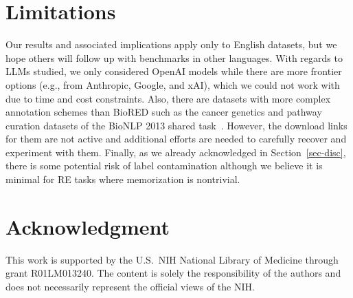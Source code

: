 \documentclass[11pt]{article}
\begin{document}
\section{Limitations}
Our results and associated implications apply only to English datasets, but we hope others will follow up with benchmarks in other languages. With regards to LLMs studied, we only considered OpenAI models while there are more frontier options (e.g., from Anthropic, Google, and xAI), which we could not work with due to time and cost constraints. Also, there are datasets with more complex annotation schemes than BioRED such as the cancer genetics and pathway curation datasets of the BioNLP 2013 shared task~\cite{nedellec2013overview}. However, the download links for them are not active and additional efforts are needed to carefully recover and experiment with them. Finally, as we  already acknowledged in Section~\ref{sec-disc}, there is some potential risk of label contamination although we believe it is minimal for RE tasks where memorization is nontrivial.  

\section*{Acknowledgment}
This work is supported by the U.S.~NIH National Library of Medicine through grant R01LM013240.  The content is solely the responsibility
of the authors and does not necessarily represent the official views of the NIH.


\end{document}
